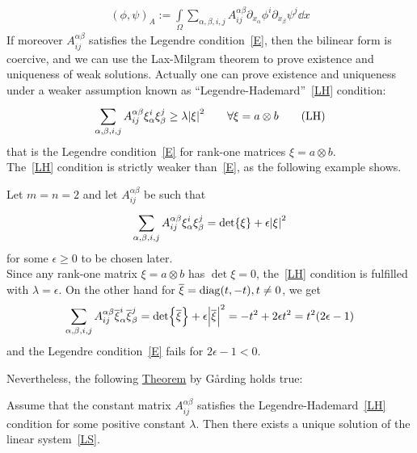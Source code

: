 \begin{gather}
    {(\phi,\psi)}_A := \int\limits_{\Omega}^{} \sum_{\alpha, \beta, i,j}^{} A_{ij}^{\alpha \beta} \partial_{x_{\alpha}} \phi^{i} \partial_{x_{\beta}} \psi^{j} \dd{x}
\end{gather}  
If moreover \(A_{ij}^{\alpha \beta}\) satisfies the Legendre condition~\eqref{E}, then the bilinear form is coercive, and we can use the Lax-Milgram theorem to prove existence and uniqueness of weak solutions. Actually one can prove existence and uniqueness under a weaker assumption known as \enquote{Legendre-Hademard}~\eqref{LH} condition:
\begin{gather}
    \sum_{\alpha,\beta,i,j}^{} A_{ij}^{\alpha \beta} \xi_{\alpha}^{i} \xi_{\beta}^{j}\geq \lambda \abs{\xi}^{2} \qquad \forall \xi=a \otimes b \tag{LH} \label{LH}
\end{gather}
that is the Legendre condition~\eqref{E} for rank-one matrices \(\xi=a\otimes b\).\\
The~\eqref{LH} condition is strictly weaker than~\eqref{E}, as the following example shows.

\begin{exm}
    Let \(m=n=2\) and let \(A_{ij}^{\alpha \beta}\) be such that
    \begin{gather}
        \sum_{\alpha, \beta, i,j}^{}  A_{ij}^{\alpha \beta} \xi_{\alpha}^{i} \xi_{\beta}^{j} = \det{\xi} + \epsilon \abs{\xi}^{2}
    \end{gather}
    for some \(\epsilon \geq 0\) to be chosen later.\\
    Since any rank-one matrix \(\xi = a \otimes b\) has \(\det{\xi}=0\), the~\eqref{LH} condition is fulfilled with \(\lambda = \epsilon \). On the other hand for \(\overline{\xi} = \operatorname{diag}(t,-t), t \neq 0\), we get
    \begin{gather}
        \sum_{\alpha, \beta, i,j}^{}  A_{ij}^{\alpha \beta} \overline{\xi}_{\alpha}^{i} \overline{\xi}_{\beta}^{j} = \det{\overline{\xi}} + \epsilon \abs{\overline{\xi}}^{2} = -t^{2}+2 \epsilon t^{2} = t^{2}(2 \epsilon -1)
    \end{gather}
    and the Legendre condition~\eqref{E} fails for \(2 \epsilon-1 <0\).
\end{exm}
Nevertheless, the following \underline{Theorem} by G\r{a}rding holds true:
\begin{thm}
    Assume that the constant matrix \(A_{ij}^{\alpha \beta}\) satisfies the Legendre-Hademard~\eqref{LH} condition for some positive constant \(\lambda \). Then there exists a unique solution of the linear system~\eqref{LS}.
\end{thm}


